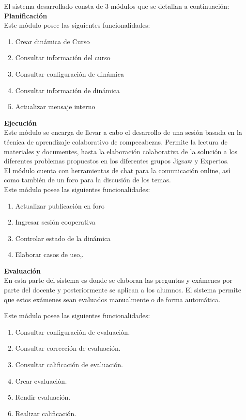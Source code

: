 El sistema desarrollado consta de 3 módulos que se detallan a continuación:\\

\textbf{Planificación}\\

Este módulo posee las siguientes funcionalidades:
\begin{enumerate}
  \item Crear dinámica de Curso
  \item Consultar información del curso
  \item Consultar configuración de dinámica
  \item Consultar información de dinámica
  \item Actualizar mensaje interno
\end{enumerate}

\textbf{Ejecución}\\

Este módulo se encarga de llevar a cabo el desarrollo de una sesión basada en la técnica de aprendizaje colaborativo de rompecabezas. Permite la lectura de materiales y documentes, hasta la elaboración colaborativa de la solución a los diferentes problemas propuestos en los diferentes grupos Jigsaw y Expertos.\\

El módulo cuenta con herramientas de chat para la comunicación online, así como también de un foro para la discusión de los temas.\\

Este módulo posee las siguientes funcionalidades:

\begin{enumerate}
  \item Actualizar publicación en foro
  \item Ingresar sesión cooperativa
  \item Controlar estado de la dinámica
  \item Elaborar casos de uso,.
\end{enumerate}

\textbf{Evaluación}\\

En esta parte del sistema es donde se elaboran las preguntas y exámenes por parte del docente y posteriormente se aplican a los alumnos. El sistema permite que estos exámenes sean evaluados manualmente o de forma automática.

Este módulo posee las siguientes funcionalidades:
\begin{enumerate}
  \item Consultar configuración de evaluación.
  \item Consultar corrección de evaluación.
  \item Consultar calificación de evaluación.
  \item Crear evaluación.
  \item Rendir evaluación.
  \item Realizar calificación.
\end{enumerate}


